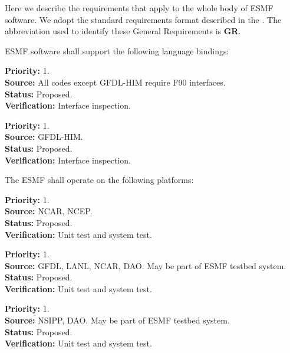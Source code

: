 
Here we describe the requirements that apply to the whole body of 
ESMF software.  We adopt the standard requirements format described in 
the .  The abbreviation used to identify
these General Requirements is {\bf GR}.


ESMF software shall support the following language bindings:

\begin{reqlist}
{\bf Priority:} 1. \\
{\bf Source:} All codes except GFDL-HIM require F90 interfaces. \\
{\bf Status:} Proposed. \\
{\bf Verification:} Interface inspection. 
\end{reqlist}

\begin{reqlist}
{\bf Priority:} 1. \\
{\bf Source:} GFDL-HIM. \\
{\bf Status:} Proposed. \\
{\bf Verification:} Interface inspection.
\end{reqlist}

The ESMF shall operate on the following platforms:

\begin{reqlist}
{\bf Priority:} 1. \\
{\bf Source:} NCAR, NCEP. \\
{\bf Status:} Proposed. \\
{\bf Verification:} Unit test and system test.
\end{reqlist}

\begin{reqlist}
{\bf Priority:} 1. \\
{\bf Source:} GFDL, LANL, NCAR, DAO.  May be part of ESMF testbed system. \\
{\bf Status:} Proposed. \\
{\bf Verification:} Unit test and system test.
\end{reqlist}

\begin{reqlist}
{\bf Priority:} 1. \\
{\bf Source:} NSIPP, DAO.  May be part of ESMF testbed system. \\
{\bf Status:} Proposed. \\
{\bf Verification:} Unit test and system test.
\end{reqlist}

